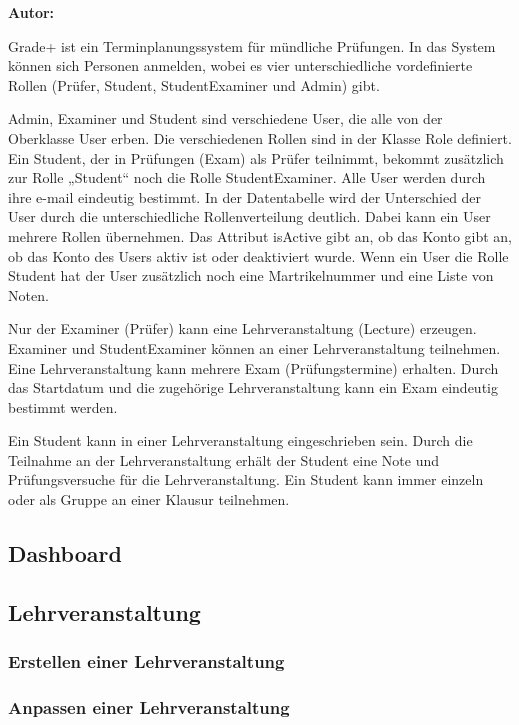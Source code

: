 \textbf{Autor:}

\glqq{}Grade+\grqq{} ist ein Terminplanungssystem für mündliche Prüfungen. In das System können sich Personen anmelden, wobei es vier unterschiedliche vordefinierte Rollen (Prüfer, Student, StudentExaminer und Admin) gibt. 

Admin, Examiner und Student sind verschiedene User, die alle von der Oberklasse User erben.
Die verschiedenen Rollen sind in der Klasse Role definiert. Ein Student, der in Prüfungen (Exam) als Prüfer teilnimmt, bekommt zusätzlich zur Rolle „Student“ noch die Rolle
StudentExaminer.
Alle User werden durch ihre e-mail eindeutig bestimmt. 
In der Datentabelle wird der Unterschied der User durch die unterschiedliche Rollenverteilung deutlich. Dabei kann ein User mehrere Rollen übernehmen.
Das Attribut isActive gibt an, ob das Konto gibt an, ob das Konto des Users aktiv ist oder deaktiviert wurde.
Wenn ein User die Rolle Student hat der User zusätzlich noch eine Martrikelnummer und eine Liste von Noten.


Nur der Examiner (Prüfer) kann eine Lehrveranstaltung (Lecture) erzeugen. 
Examiner und StudentExaminer können an einer Lehrveranstaltung teilnehmen.
Eine Lehrveranstaltung kann mehrere Exam (Prüfungstermine) erhalten.
Durch das Startdatum und die zugehörige Lehrveranstaltung kann ein Exam eindeutig bestimmt werden.


Ein Student kann in einer Lehrveranstaltung eingeschrieben sein. Durch die Teilnahme an der Lehrveranstaltung erhält der Student eine Note und Prüfungsversuche für die Lehrveranstaltung. Ein Student kann immer einzeln oder als Gruppe an einer Klausur teilnehmen.

\subsection{Dashboard}

\subsection{Lehrveranstaltung}
\subsubsection{Erstellen einer Lehrveranstaltung}
\subsubsection{Anpassen einer Lehrveranstaltung}


